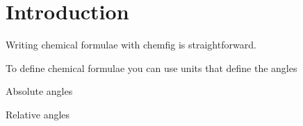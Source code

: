 \documentclass{article}
\begin{document}
	
	\section{Introduction}
	Writing chemical formulae with chemfig is straightforward.
	
	To define chemical formulae you can use units that define the angles
	
	
	Absolute angles
	
	
	Relative angles
	
\end{document}
